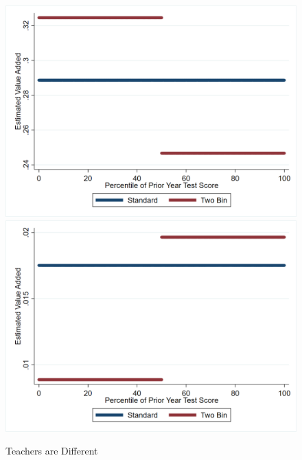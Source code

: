 \documentclass[12pt]{article}
\theoremstyle{definition}
\theoremstyle{definition}
\theoremstyle{definition}
\theoremstyle{definition}
\begin{document}
    \begin{figure}[H]
        \begin{center}
        \includegraphics[width=.45\textwidth]{Working_Paper/WP_Figures/Example_1201.png}
        \includegraphics[width=.45\textwidth]{Working_Paper/WP_Figures/Example_1246.png}
        \end{center}
            \caption{Teachers are Different}
               \label{fig_teacher_examples}
    \end{figure}
\end{document}
